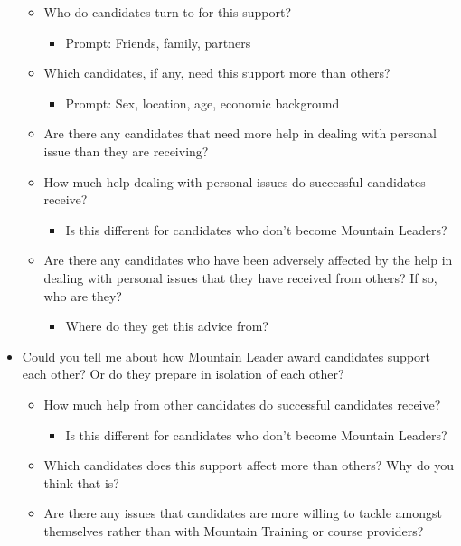 \documentclass[
  12pt,
  a4paper,
]{book}
\providecommand{\tightlist}{%
  \setlength{\itemsep}{0pt}\setlength{\parskip}{0pt}}
\begin{document}
\begin{itemize}
  \begin{itemize}
  \tightlist
  \item
    Who do candidates turn to for this support?

    \begin{itemize}
    \tightlist
    \item
      Prompt: Friends, family, partners
    \end{itemize}
  \item
    Which candidates, if any, need this support more than others?

    \begin{itemize}
    \tightlist
    \item
      Prompt: Sex, location, age, economic background
    \end{itemize}
  \item
    Are there any candidates that need more help in dealing with personal issue than they are receiving?
  \item
    How much help dealing with personal issues do successful candidates receive?

    \begin{itemize}
    \tightlist
    \item
      Is this different for candidates who don't become Mountain Leaders?
    \end{itemize}
  \item
    Are there any candidates who have been adversely affected by the help in dealing with personal issues that they have received from others? If so, who are they?

    \begin{itemize}
    \tightlist
    \item
      Where do they get this advice from?
    \end{itemize}
  \end{itemize}
\item
  Could you tell me about how Mountain Leader award candidates support each other? Or do they prepare in isolation of each other?

  \begin{itemize}
  \tightlist
  \item
    How much help from other candidates do successful candidates receive?

    \begin{itemize}
    \tightlist
    \item
      Is this different for candidates who don't become Mountain Leaders?
    \end{itemize}
  \item
    Which candidates does this support affect more than others? Why do you think that is?
  \item
    Are there any issues that candidates are more willing to tackle amongst themselves rather than with Mountain Training or course providers?


\end{itemize}
\end{itemize}
\end{document}
